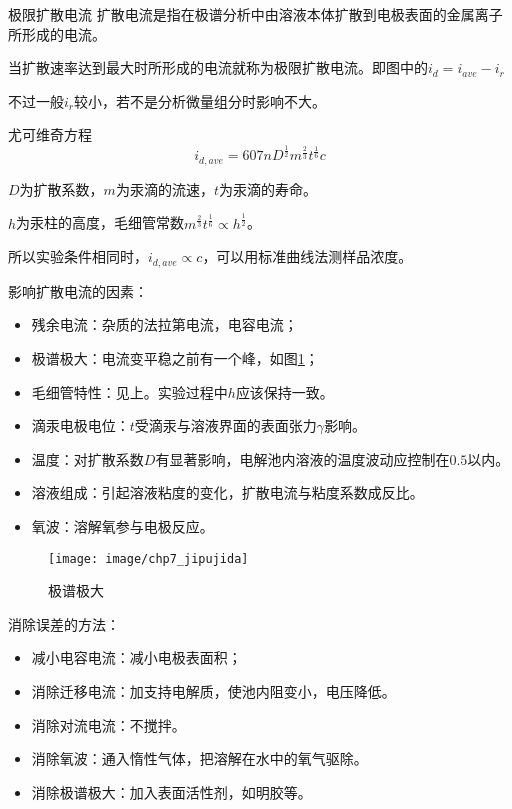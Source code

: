 \begin{definition*}{极限扩散电流}{}
	扩散电流是指在极谱分析中由溶液本体扩散到电极表面的金属离子所形成的电流。
	
	当扩散速率达到最大时所形成的电流就称为极限扩散电流。即图中的$i_d=i_{ave}-i_r$
\end{definition*}

不过一般$i_r$较小，若不是分析微量组分时影响不大。

\begin{theorem*}{尤可维奇方程}{}
	\begin{equation*}
		i_{d,ave}=607nD^{\frac{1}{2}}m^{\frac{2}{3}}t^{\frac{1}{6}}c
	\end{equation*}
	
	$D$为扩散系数，$m$为汞滴的流速，$t$为汞滴的寿命。
	
	$h$为汞柱的高度，毛细管常数$m^{\frac{2}{3}}t^{\frac{1}{6}}\propto h^{\frac{1}{2}}$。
\end{theorem*}

所以实验条件相同时，$i_{d,ave}\propto c$，可以用标准曲线法测样品浓度。

\begin{note}
	影响扩散电流的因素：
	\begin{itemize}
	\item 残余电流：杂质的法拉第电流，电容电流；
	\item 极谱极大：电流变平稳之前有一个峰，如图\ref{fig:chp7jipujida}；
	\item 毛细管特性：见上。实验过程中$h$应该保持一致。
	\item 滴汞电极电位：$t$受滴汞与溶液界面的表面张力$\gamma$影响。
	\item 温度：对扩散系数$D$有显著影响，电解池内溶液的温度波动应控制在$0.5$\textcelsius 以内。
	\item 溶液组成：引起溶液粘度的变化，扩散电流与粘度系数成反比。
	\item 氧波：溶解氧参与电极反应。
	\end{itemize}
\end{note}

\begin{figure}[!h]
	\centering
	\texttt{[image: image/chp7\_jipujida]}
	\caption{极谱极大}
	\label{fig:chp7jipujida}
\end{figure}

\begin{note}
	消除误差的方法：
	\begin{itemize}
		\item 减小电容电流：减小电极表面积；
		\item 消除迁移电流：加支持电解质，使池内阻变小，电压降低。
		\item 消除对流电流：不搅拌。
		\item 消除氧波：通入惰性气体，把溶解在水中的氧气驱除。
		\item 消除极谱极大：加入表面活性剂，如明胶等。
	\end{itemize}
\end{note}

